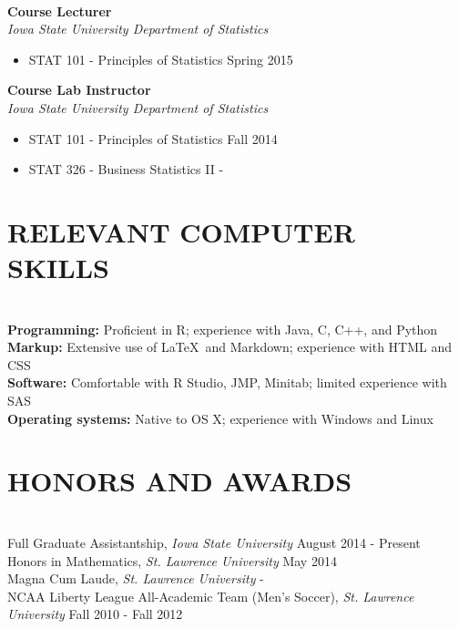 \documentclass[10pt]{res} %
\begin{document}
\begin{CJK*}{UTF8}{gbsn}
\begin{resume}
\hrulefill \\
{\bf Course Lecturer} \\
{\sl Iowa State University Department of Statistics}
\begin{itemize} \itemsep -2pt
\item STAT 101 - Principles of Statistics \hfill Spring 2015
\end{itemize}

{\bf Course Lab Instructor} \\
{\sl Iowa State University Department of Statistics}
\begin{itemize} \itemsep -2pt 
\item STAT 101 - Principles of Statistics \hfill Fall 2014
\item STAT 326 - Business Statistics II \hfill -
\end{itemize}


\section{RELEVANT COMPUTER SKILLS}

\hrulefill \\
{\bf Programming:} Proficient in R; experience with Java, C, C++, and Python\\
{\bf Markup:} Extensive use of \LaTeX\ and Markdown; experience with HTML and CSS\\
{\bf Software:} Comfortable with R Studio, JMP, Minitab; limited experience with SAS \\
{\bf Operating systems:} Native to OS X; experience with Windows and Linux


\section{HONORS AND AWARDS}

\hrulefill \\
Full Graduate Assistantship, {\sl Iowa State University} \hfill August 2014 - Present \\
Honors in Mathematics, {\sl St. Lawrence University} \hfill May 2014 \\
Magna Cum Laude, {\sl St. Lawrence University} \hfill - \\
NCAA Liberty League All-Academic Team (Men's Soccer), {\sl St. Lawrence University} \hfill Fall 2010 - Fall 2012


\end{resume}
\end{CJK*}
\end{document}
